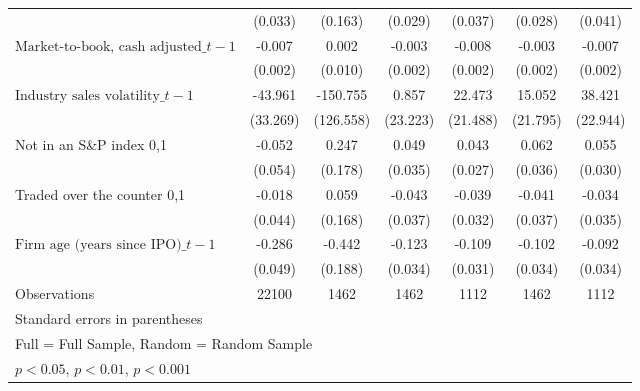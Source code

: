 {\begin{tabular}{l*{6}{c}}
                    &     (0.033)         &     (0.163)         &     (0.029)         &     (0.037)         &     (0.028)         &     (0.041)         \\
\addlinespace
$\text{Market-to-book, cash adjusted}\_{t-1}$&      -0.007\sym{**} &       0.002         &      -0.003\sym{*}  &      -0.008\sym{***}&      -0.003         &      -0.007\sym{**} \\
                    &     (0.002)         &     (0.010)         &     (0.002)         &     (0.002)         &     (0.002)         &     (0.002)         \\
\addlinespace
$\text{Industry sales volatility}\_{t-1}$&     -43.961         &    -150.755         &       0.857         &      22.473         &      15.052         &      38.421         \\
                    &    (33.269)         &   (126.558)         &    (23.223)         &    (21.488)         &    (21.795)         &    (22.944)         \\
\addlinespace
Not in an S\&P index {0,1}&      -0.052         &       0.247         &       0.049         &       0.043         &       0.062         &       0.055         \\
                    &     (0.054)         &     (0.178)         &     (0.035)         &     (0.027)         &     (0.036)         &     (0.030)         \\
\addlinespace
Traded over the counter {0,1}&      -0.018         &       0.059         &      -0.043         &      -0.039         &      -0.041         &      -0.034         \\
                    &     (0.044)         &     (0.168)         &     (0.037)         &     (0.032)         &     (0.037)         &     (0.035)         \\
\addlinespace
$\text{Firm age (years since IPO)}\_{t-1}$&      -0.286\sym{***}&      -0.442\sym{*}  &      -0.123\sym{***}&      -0.109\sym{***}&      -0.102\sym{**} &      -0.092\sym{**} \\
                    &     (0.049)         &     (0.188)         &     (0.034)         &     (0.031)         &     (0.034)         &     (0.034)         \\
\midrule
Observations        &       22100         &        1462         &        1462         &        1112         &        1462         &        1112         \\
\bottomrule
\multicolumn{7}{l}{\footnotesize Standard errors in parentheses}\\
\multicolumn{7}{l}{\footnotesize Full = Full Sample, Random = Random Sample}\\
\multicolumn{7}{l}{\footnotesize \sym{*} \(p<0.05\), \sym{**} \(p<0.01\), \sym{***} \(p<0.001\)}\\
\end{tabular}
}
